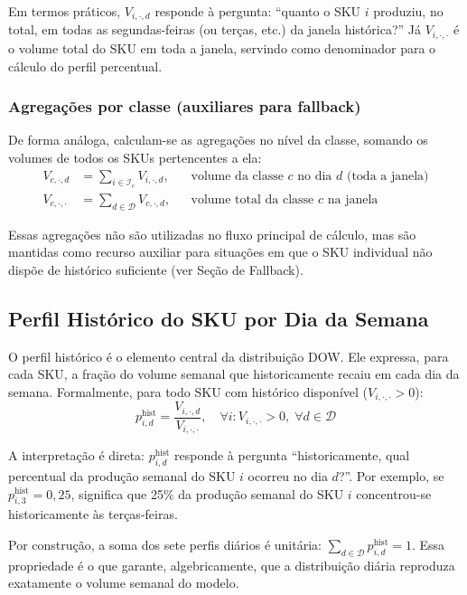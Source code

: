 \documentclass[11pt,a4paper]{article}
\begin{document}
Em termos práticos, $V_{i,\cdot,d}$ responde à pergunta: ``quanto o SKU $i$
produziu, no total, em todas as segundas-feiras (ou terças, etc.) da janela
histórica?'' Já $V_{i,\cdot,\cdot}$ é o volume total do SKU em toda a janela,
servindo como denominador para o cálculo do perfil percentual.

\subsubsection{Agregações por classe (auxiliares para fallback)}

De forma análoga, calculam-se as agregações no nível da classe, somando os
volumes de todos os SKUs pertencentes a ela:
\begin{align}\label{eq:dow:agg-classe}
V_{c,\cdot,d} &= \sum_{i \in \mathcal{I}_c} V_{i,\cdot,d},
    && \text{volume da classe } c \text{ no dia } d \text{ (toda a janela)} \\
V_{c,\cdot,\cdot} &= \sum_{d \in \mathcal{D}} V_{c,\cdot,d},
    && \text{volume total da classe } c \text{ na janela}
\end{align}

Essas agregações não são utilizadas no fluxo principal de cálculo, mas são
mantidas como recurso auxiliar para situações em que o SKU individual não
dispõe de histórico suficiente (ver Seção de Fallback).

\subsection{Perfil Histórico do SKU por Dia da Semana}

O perfil histórico é o elemento central da distribuição DOW. Ele expressa,
para cada SKU, a fração do volume semanal que historicamente recaiu em cada
dia da semana. Formalmente, para todo SKU com histórico disponível
($V_{i,\cdot,\cdot}>0$):
\begin{equation}\label{eq:dow:perfil-sku-dia}
p^{\text{hist}}_{i,d} = \frac{V_{i,\cdot,d}}{V_{i,\cdot,\cdot}},
\quad \forall i : V_{i,\cdot,\cdot}>0,\;\forall d \in \mathcal{D}
\end{equation}

A interpretação é direta: $p^{\text{hist}}_{i,d}$ responde à pergunta
``historicamente, qual percentual da produção semanal do SKU $i$ ocorreu
no dia $d$?''. Por exemplo, se $p^{\text{hist}}_{i,3} = 0{,}25$, significa
que 25\% da produção semanal do SKU $i$ concentrou-se historicamente às
terças-feiras.

Por construção, a soma dos sete perfis diários é unitária:
$\displaystyle\sum_{d \in \mathcal{D}} p^{\text{hist}}_{i,d} = 1$.
Essa propriedade é o que garante, algebricamente, que a distribuição diária
reproduza exatamente o volume semanal do modelo.
\end{document}
